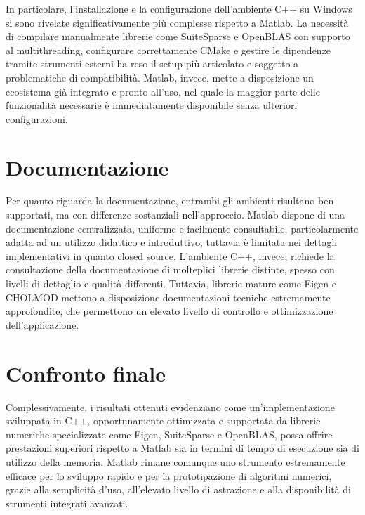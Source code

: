 In particolare, l'installazione e la configurazione dell'ambiente C++ su Windows si sono rivelate significativamente più complesse rispetto a Matlab.
La necessità di compilare manualmente librerie come SuiteSparse e OpenBLAS con supporto al multithreading,
configurare correttamente CMake e gestire le dipendenze tramite strumenti esterni ha reso il setup più articolato e soggetto a problematiche di compatibilità.
Matlab, invece, mette a disposizione un ecosistema già integrato e pronto all'uso,
nel quale la maggior parte delle funzionalità necessarie è immediatamente disponibile senza ulteriori configurazioni.
\section{Documentazione}
Per quanto riguarda la documentazione, entrambi gli ambienti risultano ben supportati, ma con differenze sostanziali nell'approccio.
Matlab dispone di una documentazione centralizzata, uniforme e facilmente consultabile, particolarmente adatta ad un utilizzo didattico e introduttivo, tuttavia è limitata nei dettagli implementativi in quanto closed source.
L'ambiente C++, invece, richiede la consultazione della documentazione di molteplici librerie distinte, spesso con livelli di dettaglio e qualità differenti.
Tuttavia, librerie mature come Eigen e CHOLMOD mettono a disposizione documentazioni tecniche estremamente approfondite,
che permettono un elevato livello di controllo e ottimizzazione dell'applicazione.

\section{Confronto finale}
Complessivamente, i risultati ottenuti evidenziano come un'implementazione sviluppata in C++,
opportunamente ottimizzata e supportata da librerie numeriche specializzate come Eigen, SuiteSparse e OpenBLAS,
possa offrire prestazioni superiori rispetto a Matlab sia in termini di tempo di esecuzione sia di utilizzo della memoria.
Matlab rimane comunque uno strumento estremamente efficace per lo sviluppo rapido e per la prototipazione di algoritmi numerici,
grazie alla semplicità d'uso, all'elevato livello di astrazione e alla disponibilità di strumenti integrati avanzati.

